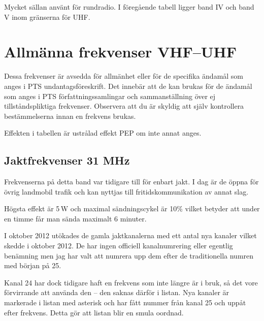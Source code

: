 Mycket sällan använt för rundradio.
I föregående tabell ligger band IV och band V inom gränserna för UHF.

\section{Allmänna frekvenser VHF--UHF}

Dessa frekvenser är avsedda för allmänhet eller för de specifika ända\-mål som
anges i PTS undantagsföreskrift. Det innebär att de kan brukas för de ändamål
som anges i PTS för\-fatt\-nings\-sam\-ling\-ar och sammanställning över ej
tillståndspliktiga frekvenser. Observera att du är skyldig att själv
kontrollera bestämmelserna innan en frekvens brukas.

Effekten i tabellen är ustrålad effekt PEP om inte annat anges.

\subsection{Jaktfrekvenser 31 MHz}

Frekvenserna på detta band var tidigare till för enbart jakt. I dag är de
öppna för övrig landmobil trafik och kan nyttjas till fritidskommunikation av
annat slag.

Högsta effekt är 5\,W och maximal sändningscykel är 10\% vilket betyder att
under en timme får man sända maximalt 6 minuter.

I oktober 2012 utökades de gamla jaktkanalerna med ett antal nya kanaler
vilket skedde i oktober 2012. De har ingen officiell kanalnumrering eller
egentlig benämning men jag har valt att numrera upp dem efter de traditionella
numren med början på 25.

Kanal 24 har dock tidigare haft en frekvens som inte längre är i bruk, så det
vore förvirrande att använda den -- den saknas därför i listan. Nya kanaler är
markerade i listan med asterisk och har fått nummer från kanal 25 och uppåt
efter frekvens. Detta gör att listan blir en smula oordnad.

